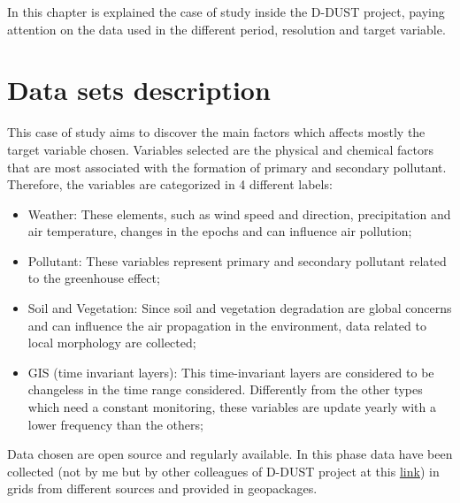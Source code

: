 In this chapter is explained the case of study inside the D-DUST project, paying attention on the data used in the different period, resolution and target variable. 

\section{Data sets description}
This case of study aims to discover the main factors which affects mostly the target variable chosen. 
Variables selected are the physical and chemical factors that are most associated with the formation of primary and secondary pollutant. \newline
Therefore, the variables are categorized in 4 different labels:
\begin{itemize}
\item Weather: These elements, such as wind speed and direction, precipitation and air temperature, changes in the epochs and can influence air pollution;
\item Pollutant: These variables represent primary and secondary pollutant related to the greenhouse effect;
\item Soil and Vegetation: Since soil and vegetation degradation are global concerns and can influence the air propagation in the environment, data related to local morphology are collected;
\item GIS (time invariant layers): This time-invariant layers are considered to be changeless in the time range considered. Differently from the other types which need a constant monitoring, these variables are update yearly with a lower frequency than the others;
\end{itemize}
Data chosen are open source and regularly available.
In this phase data have been collected (not by me but by other colleagues of D-DUST project at this \underline{ \href{https://docs.google.com/spreadsheets/d/1-5pwMSc1QlFyC8iIaA-l1fWhWtpqVio2/edit\#gid=91313358}{link}}) in grids from different sources and provided in geopackages. 
